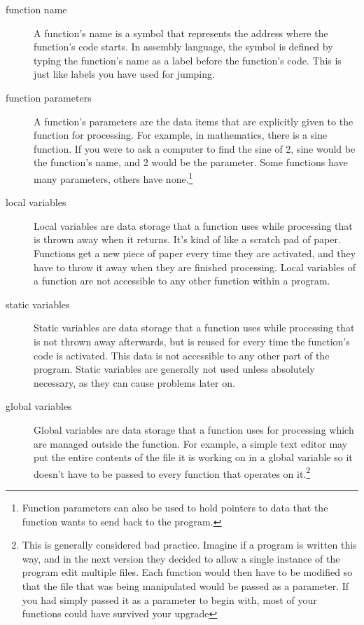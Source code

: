 \begin{description}
\item[function name] A function's name is a symbol
that represents the address where the 
function's code starts.  In assembly language, the symbol is defined
by typing the function's name as a label
before the function's code.  This is just like labels you have used
for jumping.
\item[function parameters] A function's parameters
are the data items that are explicitly
given to the function for processing.  For example, in mathematics,
there is a sine function.  If you were to ask a computer to find the sine
of 2, sine would be the function's name, and 2 would be the parameter.  Some
functions have many parameters, others have none.\footnote{Function parameters
can also be used to hold pointers to data that the function wants to send back to the
program.}
\item[local variables] Local variables 
are data storage that a function uses
while processing that is thrown away when it returns.  It's kind of like
a scratch pad of paper.  Functions get a new piece of paper every time they
are activated, and they have to throw it away when they are
finished processing.  Local variables of a function are not accessible
to any other function within a program.
\item[static variables] Static variables are data storage that a function
uses while processing that is not thrown away afterwards, but is
reused for every time the function's code is activated.  This data
is not accessible to any other part of the program.  Static
variables are generally  not used unless absolutely necessary, as they
can cause problems later on.
\item[global variables] Global variables
are data storage that a function uses for processing
which are managed outside the function.  For example, a simple text editor
may put the entire contents of the file it is working on in a global
variable so it doesn't have to be passed to every function that operates
on it.\footnote{This is generally considered bad practice.  Imagine
if a program is written this way, and in the next version they decided
to allow a single instance of the program edit multiple files.  Each function
would then have to be modified so that the file that was being manipulated
would be passed as a parameter.  If you had simply passed it as a parameter
to begin with, most of your functions could have survived your upgrade
}
\end{description}
